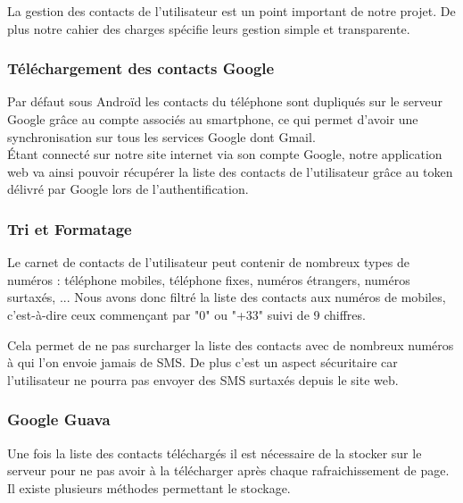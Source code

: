 La gestion des contacts de l'utilisateur est un point important de notre projet.
De plus notre cahier des charges spécifie leurs gestion simple et transparente.


\subsubsection{Téléchargement des contacts Google}
\label{Téléchargement des contacts Google}

Par défaut sous Androïd les contacts du téléphone sont dupliqués sur le serveur Google grâce au compte associés au smartphone, ce qui permet d'avoir une synchronisation sur tous les services Google dont Gmail.
\\


Étant connecté sur notre site internet via son compte Google, notre application web va ainsi pouvoir récupérer la liste des contacts de l'utilisateur grâce au token délivré par Google lors de l'authentification.


\subsubsection{Tri et Formatage}

Le carnet de contacts de l'utilisateur peut contenir de nombreux types de numéros : téléphone mobiles, téléphone fixes, numéros étrangers, numéros surtaxés, ...
Nous avons donc filtré la liste des contacts aux numéros de mobiles, c'est-à-dire ceux commençant par "0" ou "+33" suivi de 9 chiffres.

Cela permet de ne pas surcharger la liste des contacts avec de nombreux numéros à qui l'on envoie jamais de SMS.
De plus c'est un aspect sécuritaire car l'utilisateur ne pourra pas envoyer des SMS surtaxés depuis le site web.


\subsubsection{Google Guava}

Une fois la liste des contacts téléchargés il est nécessaire de la stocker sur le serveur pour ne pas avoir à la télécharger après chaque rafraichissement de page.
Il existe plusieurs méthodes permettant le stockage.

